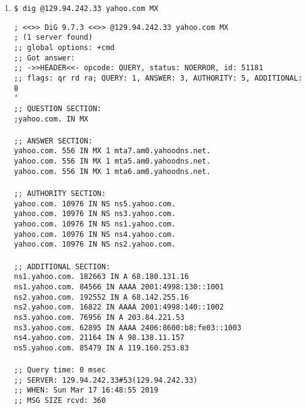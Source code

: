 \documentclass[a4paper,11pt]{article}
\newcommand{\code}{\texttt}
\begin{document}
\begin{enumerate}[leftmargin=*]
	\pagebreak

	\item \code{\$ dig @129.94.242.33 yahoo.com MX}

	\code{; <<>> DiG 9.7.3 <<>> @129.94.242.33 yahoo.com MX\\
	; (1 server found)\\
	;; global options: +cmd\\
	;; Got answer:\\
	;; ->>HEADER<<- opcode: QUERY, status: NOERROR, id: 51181\\
	;; flags: qr rd ra; QUERY: 1, ANSWER: 3, AUTHORITY: 5, ADDITIONAL: 8\\
`	\\
	;; QUESTION SECTION:\\
	;yahoo.com.			IN	MX\\
	\\
	;; ANSWER SECTION:\\
	yahoo.com.		556	IN	MX	1 mta7.am0.yahoodns.net.\\
	yahoo.com.		556	IN	MX	1 mta5.am0.yahoodns.net.\\
	yahoo.com.		556	IN	MX	1 mta6.am0.yahoodns.net.\\
	\\
	;; AUTHORITY SECTION:\\
	yahoo.com.		10976	IN	NS	ns5.yahoo.com.\\
	yahoo.com.		10976	IN	NS	ns3.yahoo.com.\\
	yahoo.com.		10976	IN	NS	ns1.yahoo.com.\\
	yahoo.com.		10976	IN	NS	ns4.yahoo.com.\\
	yahoo.com.		10976	IN	NS	ns2.yahoo.com.\\
	\\
	;; ADDITIONAL SECTION:\\
	ns1.yahoo.com.		182663	IN	A	68.180.131.16\\
	ns1.yahoo.com.		84566	IN	AAAA	2001:4998:130::1001\\
	ns2.yahoo.com.		192552	IN	A	68.142.255.16\\
	ns2.yahoo.com.		16822	IN	AAAA	2001:4998:140::1002\\
	ns3.yahoo.com.		76956	IN	A	203.84.221.53\\
	ns3.yahoo.com.		62895	IN	AAAA	2406:8600:b8:fe03::1003\\
	ns4.yahoo.com.		21164	IN	A	98.138.11.157\\
	ns5.yahoo.com.		85479	IN	A	119.160.253.83\\
	\\
	;; Query time: 0 msec\\
	;; SERVER: 129.94.242.33\#53(129.94.242.33)\\
	;; WHEN: Sun Mar 17 16:48:55 2019\\
	;; MSG SIZE  rcvd: 360\\}


\end{enumerate}
\end{document}
